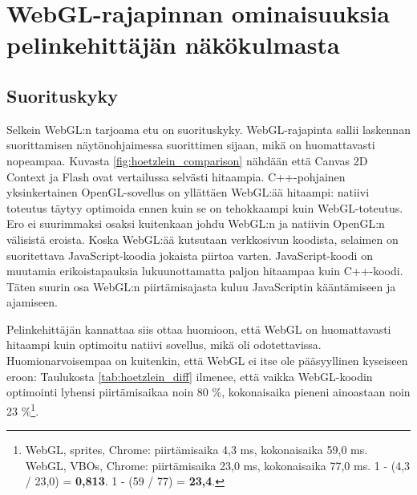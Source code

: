 \section{WebGL-rajapinnan ominaisuuksia pelinkehittäjän näkökulmasta}
\label{sec:materiaali}

\subsection{Suorituskyky}
Selkein WebGL:n tarjoama etu on suorituskyky. WebGL-rajapinta sallii laskennan suorittamisen näytönohjaimessa suorittimen sijaan, mikä on huomattavasti nopeampaa. Kuvasta \ref{fig:hoetzlein_comparison} nähdään että Canvas 2D Context ja Flash ovat vertailussa selvästi hitaampia. C++-pohjainen yksinkertainen OpenGL-sovellus on yllättäen WebGL:ää hitaampi: natiivi toteutus täytyy optimoida ennen kuin se on tehokkaampi kuin WebGL-toteutus.\cite{hoetzlein} Ero ei suurimmaksi osaksi kuitenkaan johdu WebGL:n ja natiivin OpenGL:n välisistä eroista. Koska WebGL:ää kutsutaan verkkosivun koodista, selaimen on suoritettava JavaScript-koodia jokaista piirtoa varten. JavaScript-koodi on muutamia erikoistapauksia lukuunottamatta paljon hitaampaa kuin C++-koodi\cite{smedberg}. Täten suurin osa WebGL:n piirtämisajasta kuluu JavaScriptin kääntämiseen ja ajamiseen\cite{hoetzlein}.

Pelinkehittäjän kannattaa siis ottaa huomioon, että WebGL on huomattavasti hitaampi kuin optimoitu natiivi sovellus, mikä oli odotettavissa. Huomionarvoisempaa on kuitenkin, että WebGL ei itse ole pääsyyllinen kyseiseen eroon: Taulukosta \ref{tab:hoetzlein_diff} ilmenee, että vaikka WebGL-koodin optimointi lyhensi piirtämisaikaa noin 80 \%, kokonaisaika pieneni ainoastaan noin 23 \%\footnote{WebGL, sprites, Chrome: piirtämisaika 4,3 ms, kokonaisaika 59,0 ms. WebGL, VBOs, Chrome: piirtämisaika 23,0 ms, kokonaisaika 77,0 ms. 1 - (4,3 / 23,0) = \textbf{0,813}. 1 - (59 / 77) = \textbf{23,4}.}.


